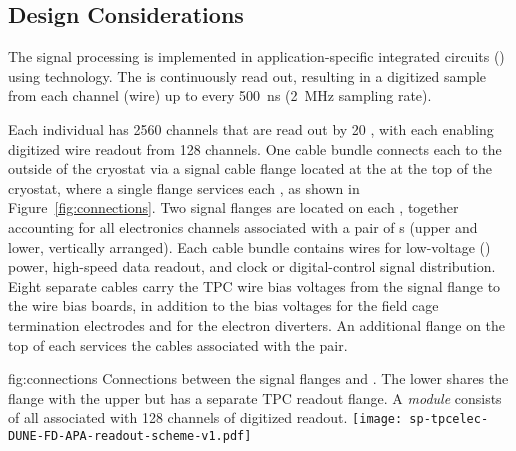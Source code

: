 
\subsection{Design Considerations}
\label{sec:fdsp-tpcelec-overview-design}

The  signal processing is implemented in application-specific integrated circuits ()
using  technology.  The  is continuously read out, resulting in a digitized 
sample from each  channel (wire) up to every \SI{500}{ns} (\SI{2}{MHz} sampling rate).

Each individual  has \num{2560} channels that are read out by \num{20} , with
each  enabling digitized wire readout from \num{128} channels.  One cable bundle connects each  to
the outside of the cryostat via a  signal cable flange located at the  \fdth at the
top of the cryostat, where a single flange services each , as shown in Figure~\ref{fig:connections}.  Two  signal flanges are located on each \fdth, together accounting for all electronics channels associated with a pair of s (upper and lower, vertically arranged).
Each cable bundle contains wires for low-voltage () power, high-speed data readout, and
clock or digital-control signal distribution.  Eight separate cables carry the TPC wire bias voltages
from the signal flange to the  wire bias boards, in addition to the bias voltages for the field
cage termination electrodes and for the electron diverters.  An additional flange on the top of each \fdth services the  cables associated with the  pair.

\begin{dunefigure}
{fig:connections}
{Connections between the signal flanges and . The lower  shares the  flange with the upper  but has a separate TPC readout flange. A \textit{ module} consists of all  associated with \num{128} channels of digitized readout.}
\texttt{[image: sp-tpcelec-DUNE-FD-APA-readout-scheme-v1.pdf]}
\end{dunefigure}

